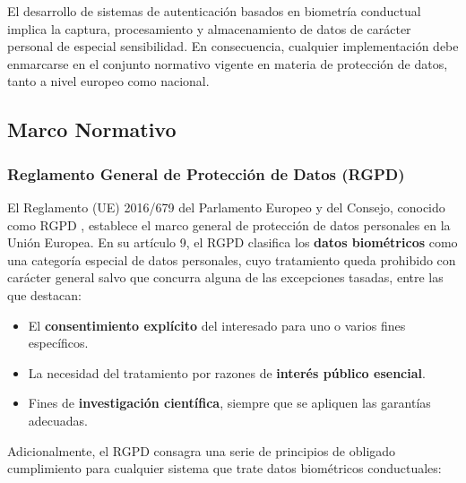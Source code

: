 El desarrollo de sistemas de autenticación basados en biometría conductual 
implica la captura, procesamiento y almacenamiento de datos de carácter 
personal de especial sensibilidad. En consecuencia, cualquier implementación 
debe enmarcarse en el conjunto normativo vigente en materia de protección 
de datos, tanto a nivel europeo como nacional.

\subsection{Marco Normativo}

\subsubsection{Reglamento General de Protección de Datos (RGPD)}

El Reglamento (UE) 2016/679 del Parlamento Europeo y del Consejo, 
conocido como RGPD \cite{rgpd2016}, establece el marco general de 
protección de datos personales en la Unión Europea. En su artículo 9, 
el RGPD clasifica los \textbf{datos biométricos} como una categoría 
especial de datos personales, cuyo tratamiento queda prohibido con 
carácter general salvo que concurra alguna de las excepciones tasadas, 
entre las que destacan:

\begin{itemize}
    \item El \textbf{consentimiento explícito} del interesado para uno 
    o varios fines específicos.
    \item La necesidad del tratamiento por razones de \textbf{interés 
    público esencial}.
    \item Fines de \textbf{investigación científica}, siempre que se 
    apliquen las garantías adecuadas.
\end{itemize}

Adicionalmente, el RGPD consagra una serie de principios de obligado 
cumplimiento para cualquier sistema que trate datos biométricos 
conductuales:

